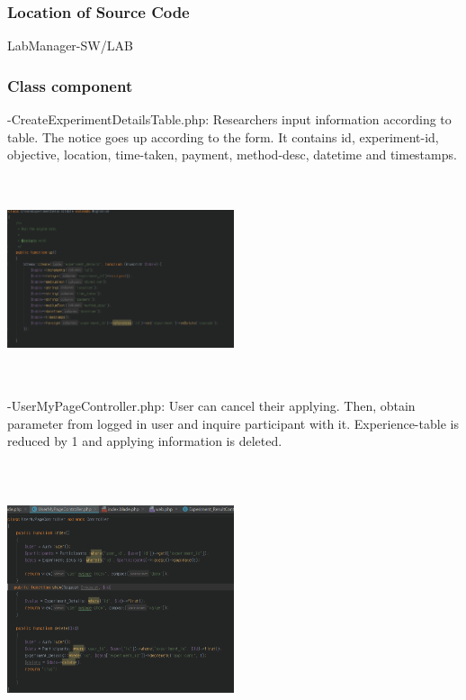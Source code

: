 \documentclass[letterpaper, 10 pt, conference]{ieeeconf}  %
\begin{document}
\subsubsection{Location of Source Code}
LabManager-SW/LAB
\subsubsection{Class component}

-CreateExperimentDetailsTable.php: Researchers input information according to table. The notice goes up according to the form. It contains id, experiment-id, objective, location, time-taken, payment, method-desc, datetime and timestamps.
\begin{center}
\includegraphics[width=0.5\textwidth,height = 6cm]{class/1.png}
\end{center}

-UserMyPageController.php: User can cancel their applying. Then, obtain parameter from logged in user and inquire participant with it. Experience-table is reduced by 1 and applying information is deleted.
\begin{center}
\includegraphics[width=0.5\textwidth,height = 8cm]{class/2.png}
\end{center}
\end{document}
